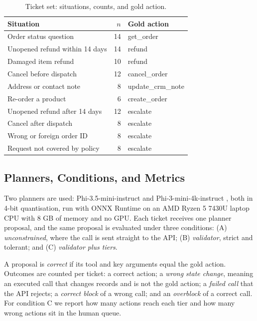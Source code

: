 \documentclass{icaiit2027}
\begin{document}
\begin{table}[t]
  \caption{Ticket set: situations, counts, and gold action.}
  \label{tab:tickets}
  \centering\footnotesize
  \setlength{\tabcolsep}{3pt}
  \begin{tabularx}{\columnwidth}{@{}X r l@{}}
    \toprule
    Situation & $n$ & Gold action \\
    \midrule
    Order status question & 14 & get\_order \\
    Unopened refund within 14 days & 14 & refund \\
    Damaged item refund & 10 & refund \\
    Cancel before dispatch & 12 & cancel\_order \\
    Address or contact note & 8 & update\_crm\_note \\
    Re-order a product & 6 & create\_order \\
    Unopened refund after 14 days & 12 & escalate \\
    Cancel after dispatch & 8 & escalate \\
    Wrong or foreign order ID & 8 & escalate \\
    Request not covered by policy & 8 & escalate \\
    \bottomrule
  \end{tabularx}
\end{table}

\subsection{Planners, Conditions, and Metrics}

Two planners are used: Phi-3.5-mini-instruct and Phi-3-mini-4k-instruct \cite{abdin2024}, both in 4-bit quantisation, run with ONNX Runtime on an AMD Ryzen 5 7430U laptop CPU with 8 GB of memory and no GPU. Each ticket receives one planner proposal, and the same proposal is evaluated under three conditions: (A) \emph{unconstrained}, where the call is sent straight to the API; (B) \emph{validator}, strict and tolerant; and (C) \emph{validator plus tiers}.

A proposal is \emph{correct} if its tool and key arguments equal the gold action. Outcomes are counted per ticket: a correct action; a \emph{wrong state change}, meaning an executed call that changes records and is not the gold action; a \emph{failed call} that the API rejects; a \emph{correct block} of a wrong call; and an \emph{overblock} of a correct call. For condition C we report how many actions reach each tier and how many wrong actions sit in the human queue.
\end{document}
